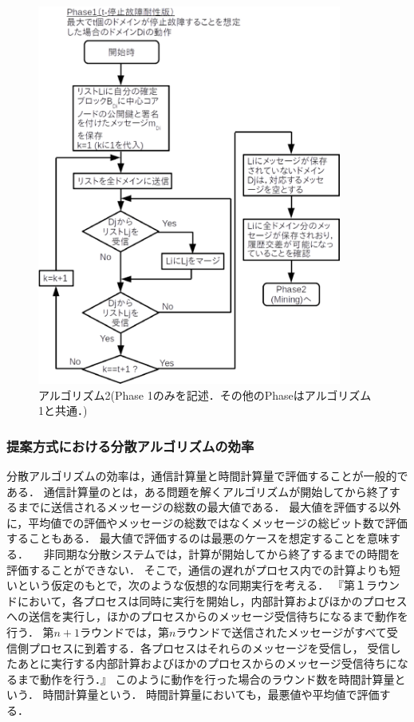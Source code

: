 \documentclass[a4paper,12pt]{jsarticle}
\begin{document}
%
%
\begin{figure}[H]%
  \begin{center}
    \includegraphics[width=100mm]{pht/flow_chart-algorithm2.eps}
  \end{center}
  \caption{アルゴリズム2(Phase 1のみを記述．その他のPhaseはアルゴリズム1と共通．)}
  \label{fig:algorithm2}
\end{figure}
%
      \subsubsection{提案方式における分散アルゴリズムの効率}%
分散アルゴリズムの効率は，通信計算量と時間計算量で評価することが一般的である．
通信計算量のとは，ある問題を解くアルゴリズムが開始してから終了するまでに送信されるメッセージの総数の最大値である．
最大値を評価する以外に，平均値での評価やメッセージの総数ではなくメッセージの総ビット数で評価することもある．
最大値で評価するのは最悪のケースを想定することを意味する．
　非同期な分散システムでは，計算が開始してから終了するまでの時間を評価することができない．
そこで，通信の遅れがプロセス内での計算よりも短いという仮定のもとで，次のような仮想的な同期実行を考える．
『第１ラウンドにおいて，各プロセスは同時に実行を開始し，内部計算およびほかのプロセスへの送信を実行し，ほかのプロセスからのメッセージ受信待ちになるまで動作を行う．
第$n + 1$ラウンドでは，第$n$ラウンドで送信されたメッセージがすべて受信側プロセスに到着する．各プロセスはそれらのメッセージを受信し，
受信したあとに実行する内部計算およびほかのプロセスからのメッセージ受信待ちになるまで動作を行う．』
このように動作を行った場合のラウンド数を時間計算量という．
時間計算量という．
時間計算量においても，最悪値や平均値で評価する．
\end{document}
